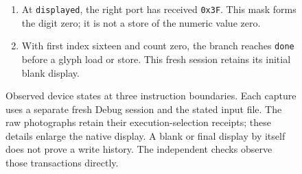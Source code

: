 \begin{figure}[htbp]
\begin{minipage}{\linewidth}
\begin{enumerate}
      \item At \texttt{displayed}, the right port has received \texttt{0x3F}. This mask forms the digit zero; it is not a store of the numeric value zero.
      \item With first index sixteen and count zero, the branch reaches \texttt{done} before a glyph load or store. This fresh session retains its initial blank display.
    \end{enumerate}
  \end{minipage}
  \caption{Observed device states at three instruction boundaries. Each capture uses a separate fresh Debug session and the stated input file. The raw photographs retain their execution-selection receipts; these details enlarge the native display. A blank or final display by itself does not prove a write history. The independent checks observe those transactions directly.}
  \label{fig:revision-loop-port-store}
\end{figure}
